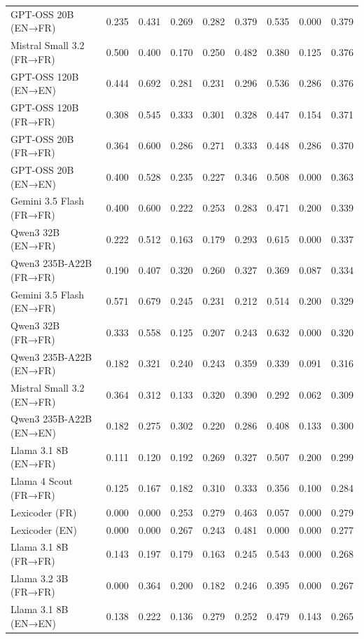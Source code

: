 \begin{tabular}{lcccccccc}
GPT-OSS 20B (EN→FR) & 0.235 & 0.431 & 0.269 & 0.282 & 0.379 & 0.535 & 0.000 & 0.379 \\
Mistral Small 3.2 (FR→FR) & 0.500 & 0.400 & 0.170 & 0.250 & 0.482 & 0.380 & 0.125 & 0.376 \\
GPT-OSS 120B (EN→EN) & 0.444 & 0.692 & 0.281 & 0.231 & 0.296 & 0.536 & 0.286 & 0.376 \\
GPT-OSS 120B (FR→FR) & 0.308 & 0.545 & 0.333 & 0.301 & 0.328 & 0.447 & 0.154 & 0.371 \\
GPT-OSS 20B (FR→FR) & 0.364 & 0.600 & 0.286 & 0.271 & 0.333 & 0.448 & 0.286 & 0.370 \\
GPT-OSS 20B (EN→EN) & 0.400 & 0.528 & 0.235 & 0.227 & 0.346 & 0.508 & 0.000 & 0.363 \\
Gemini 3.5 Flash (FR→FR) & 0.400 & 0.600 & 0.222 & 0.253 & 0.283 & 0.471 & 0.200 & 0.339 \\
Qwen3 32B (EN→FR) & 0.222 & 0.512 & 0.163 & 0.179 & 0.293 & 0.615 & 0.000 & 0.337 \\
Qwen3 235B-A22B (FR→FR) & 0.190 & 0.407 & 0.320 & 0.260 & 0.327 & 0.369 & 0.087 & 0.334 \\
Gemini 3.5 Flash (EN→FR) & 0.571 & 0.679 & 0.245 & 0.231 & 0.212 & 0.514 & 0.200 & 0.329 \\
Qwen3 32B (FR→FR) & 0.333 & 0.558 & 0.125 & 0.207 & 0.243 & 0.632 & 0.000 & 0.320 \\
Qwen3 235B-A22B (EN→FR) & 0.182 & 0.321 & 0.240 & 0.243 & 0.359 & 0.339 & 0.091 & 0.316 \\
Mistral Small 3.2 (EN→FR) & 0.364 & 0.312 & 0.133 & 0.320 & 0.390 & 0.292 & 0.062 & 0.309 \\
Qwen3 235B-A22B (EN→EN) & 0.182 & 0.275 & 0.302 & 0.220 & 0.286 & 0.408 & 0.133 & 0.300 \\
Llama 3.1 8B (EN→FR) & 0.111 & 0.120 & 0.192 & 0.269 & 0.327 & 0.507 & 0.200 & 0.299 \\
Llama 4 Scout (FR→FR) & 0.125 & 0.167 & 0.182 & 0.310 & 0.333 & 0.356 & 0.100 & 0.284 \\
Lexicoder (FR) & 0.000 & 0.000 & 0.253 & 0.279 & 0.463 & 0.057 & 0.000 & 0.279 \\
Lexicoder (EN) & 0.000 & 0.000 & 0.267 & 0.243 & 0.481 & 0.000 & 0.000 & 0.277 \\
Llama 3.1 8B (FR→FR) & 0.143 & 0.197 & 0.179 & 0.163 & 0.245 & 0.543 & 0.000 & 0.268 \\
Llama 3.2 3B (FR→FR) & 0.000 & 0.364 & 0.200 & 0.182 & 0.246 & 0.395 & 0.000 & 0.267 \\
Llama 3.1 8B (EN→EN) & 0.138 & 0.222 & 0.136 & 0.279 & 0.252 & 0.479 & 0.143 & 0.265 \\

\end{tabular}
